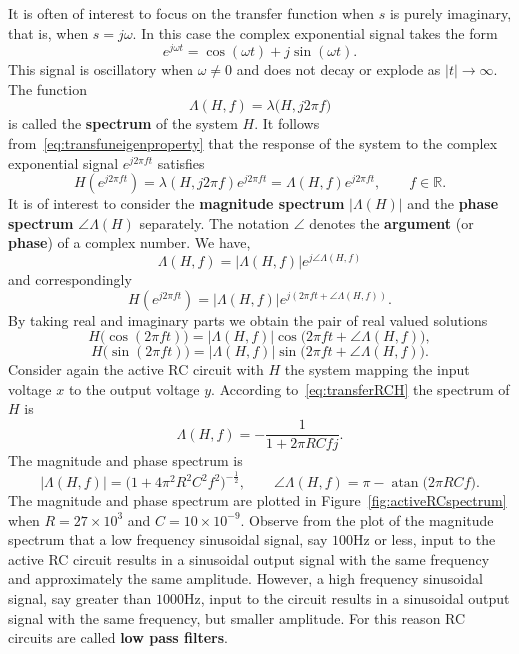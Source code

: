 \documentclass[11pt,a4paper]{book}
\theoremstyle{plain}
\numberwithin{equation}{section}
\newcommand{\reals}{{\mathbb R}}
\newcommand{\atan}[1]{\operatorname{atan}}
\newcommand{\term}{\textbf}
\newcommand{\abs}[1]{\left\vert #1 \right\vert}
\begin{document}
It is often of interest to focus on the transfer function when $s$ is purely imaginary, that is, when $s = j \omega$.  In this case the complex exponential signal takes the form
\[
e^{j\omega t} = \cos( \omega t) + j \sin(\omega t).
\] 
This signal is oscillatory when $\omega \neq 0$ and does not decay or explode as $\abs{t} \rightarrow \infty$.  The function %
\[
\Lambda(H,f) = \lambda\big(H, j 2\pi f \big)
\]
is called the \term{spectrum} of the system $H$.  It follows from~\eqref{eq:transfuneigenproperty} that the response of the system to the complex exponential signal $e^{j2\pi ft}$ satisfies
\[
H(e^{j 2\pi f t})  = \lambda(H, j 2\pi f) e^{j 2\pi f t} = \Lambda(H,f) e^{j 2\pi f t}, \qquad f \in \reals. 
\]
It is of interest to consider the \term{magnitude spectrum} $\abs{\Lambda(H)}$ and the \term{phase spectrum} $\angle{\Lambda(H)}$ separately.  The notation $\angle$ denotes the \term{argument} (or \term{phase}) of a complex number.  We have,
\[
\Lambda(H,f) = \abs{\Lambda(H,f)} e^{j \angle{\Lambda(H,f)}}
\]  
and correspondingly
\[
H(e^{j 2\pi f t}) = \abs{\Lambda(H,f)} e^{j ( 2\pi f t + \angle{\Lambda(H,f)})}.
\]
By taking real and imaginary parts we obtain the pair of real valued solutions
\[
H\big( \cos(2\pi f t) \big) = \abs{\Lambda(H,f)} \cos\big(2\pi f t + \angle{\Lambda(H,f)}\big),
\]
\begin{equation}\label{eq:spectrumrealvaluedsinsolution}
H\big( \sin(2\pi f t) \big) = \abs{\Lambda(H,f)} \sin\big(2\pi f t + \angle{\Lambda(H,f)}\big).
\end{equation}
Consider again the active RC circuit with $H$ the system mapping the input voltage $x$ to the output voltage $y$.  According to~\eqref{eq:transferRCH} the spectrum of $H$ is
\begin{equation}\label{eq:specactiveRC}
\Lambda(H, f) = -\frac{1}{1 + 2 \pi RC f j}.
\end{equation}
The magnitude and phase spectrum is
\[
\abs{\Lambda(H, f)} = \big(1 + 4\pi^2 R^2 C^2 f^2\big)^{-\tfrac{1}{2}}, \qquad \angle \Lambda(H,f) = \pi - \atan\big( 2\pi R C f \big).
\]
The magnitude and phase spectrum are plotted in Figure~\ref{fig:activeRCspectrum} when $R=27 \times 10^3$ and $C= 10 \times 10^{-9}$.  Observe from the plot of the magnitude spectrum that a low frequency sinusoidal signal, say $100\si{\hertz}$ or less, input to the active RC circuit results in a sinusoidal output signal with the same frequency and approximately the same amplitude.  However, a high frequency sinusoidal signal, say greater than $1000\si{\hertz}$, input to the circuit results in a sinusoidal output signal with the same frequency, but smaller amplitude.  For this reason RC circuits are called \term{low pass filters}.
\end{document}
